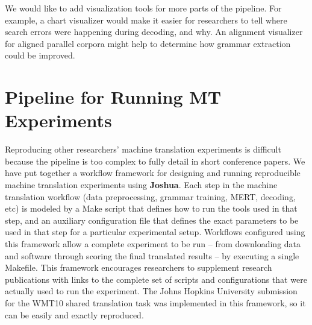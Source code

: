 \documentclass[11pt]{article}
\newcommand{\joshua}{\textbf{Joshua}\xspace}
\begin{document}
We would like to add visualization tools for more parts of the pipeline. For
example, a chart visualizer would make it easier for researchers to tell where
search errors were happening during decoding, and why. An alignment visualizer
for aligned parallel corpora might help to determine how grammar extraction 
could be improved.


\section{Pipeline for Running MT Experiments}

Reproducing other researchers' machine translation experiments is difficult because the pipeline is too complex to fully detail in short conference papers. We have put together a workflow framework for designing and running reproducible machine translation experiments using \joshua \cite{Schwartz-wmt10-pipline}. Each step in the machine translation workflow (data preprocessing, grammar training, MERT, decoding, etc) is modeled by a Make script that defines how to run the tools used in that step, and an auxiliary configuration file that defines the exact parameters to be used in that step for a particular experimental setup. Workflows configured using this framework allow a complete experiment to be run -- from downloading data and software through scoring the final translated results -- by executing a single Makefile.
This framework encourages researchers to supplement research publications with links to the complete set of scripts and configurations that were actually used to run the experiment. The Johns Hopkins University submission for the WMT10 shared translation task was implemented in this framework, so it can be easily and exactly reproduced.


\end{document}
